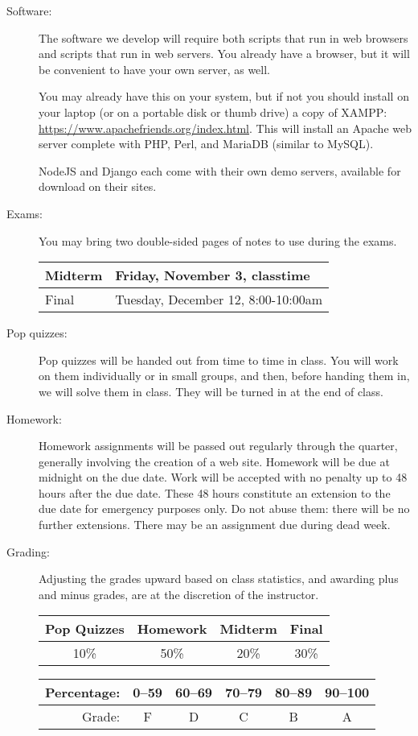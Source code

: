 \documentclass{article}
\begin{document}
\begin{description}
  
\item[Software:] The software we develop will require both
  scripts that run in web browsers and scripts that run in web
  servers.  You already have a browser, but it will be convenient to
  have your own server, as well.

  You may already have this on your system, but if not you should
  install on your laptop (or on a portable disk or thumb drive) a copy
  of XAMPP: \url{https://www.apachefriends.org/index.html}.  This will
  install an Apache web server complete with PHP, Perl, and MariaDB
  (similar to MySQL).

  NodeJS and Django each come with their own demo servers, available
  for download on their sites.

\item[Exams:]   You may bring two
  double-sided pages of notes to use during the exams.

  \begin{tabular}{|l|l|}\hline
    Midterm &  Friday, November 3, classtime  \\\hline
Final   & Tuesday, December 12, 8:00-10:00am \\\hline
    \end{tabular}

\item[Pop quizzes:]  Pop quizzes will be handed out from time to
  time in class.  You will work on them individually or in small
  groups, and then, before handing them in, we will solve them in
  class.  They will be turned in at the end of class.

\item[Homework:] Homework assignments will be passed out regularly
  through the quarter, generally involving the creation of a web site.
  Homework will be due at midnight on the due date.  Work will be
  accepted with no penalty up to 48 hours after the due date.  These
  48 hours constitute an extension to the due date for emergency
  purposes only.  Do not abuse them: there will be no further
  extensions.  There may be an assignment due during dead week.

\item[Grading:]  Adjusting the grades upward based on class
  statistics, and awarding plus and minus grades, are at the
  discretion of the instructor.

\begin{tabular}{|c|c|c|c|}\hline
Pop Quizzes & Homework  & Midterm & Final\\\hline
10\% & 50\% & 20\% & 30\%\\\hline
\end{tabular}\hfill
  \begin{tabular}{|r|c|c|c|c|c|}\hline
    Percentage: & 0--59 & 60--69 & 70--79 & 80--89 & 90--100\\\hline
    Grade: & F & D & C & B & A \\\hline
    \end{tabular}


\end{description}
\end{document}

